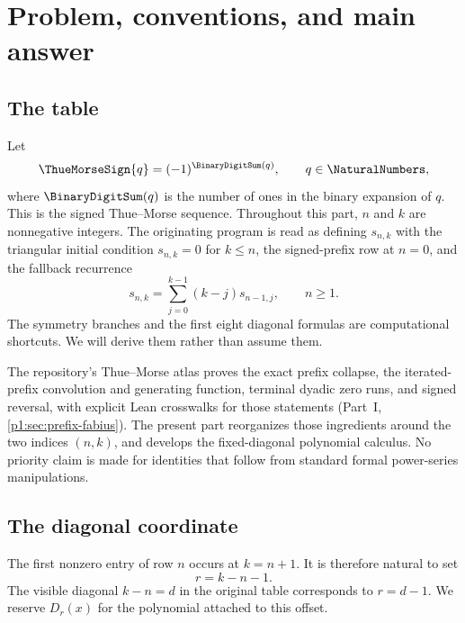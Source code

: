 \documentclass[11pt,oneside]{article}
\numberwithin{equation}{section}
\theoremstyle{definition}
\theoremstyle{remark}
\begin{document}
\section{Problem, conventions, and main answer}\label{p3:ch:problem}

\subsection{The table}

Let
\begin{equation}
  \ThueMorseSign{q}=(-1)^{\BinaryDigitSum(q)},\qquad q\in\NaturalNumbers,
  \label{p3:a:eq:tm-sign}
\end{equation}
where \(\BinaryDigitSum(q)\) is the number of ones in the binary expansion of \(q\).
This is the signed Thue--Morse sequence.  Throughout this part, \(n\) and
\(k\) are nonnegative integers.  The originating program is read as defining
\(s_{n,k}\) with the triangular initial condition \(s_{n,k}=0\) for
\(k\le n\), the signed-prefix row at \(n=0\), and the fallback recurrence
\begin{equation}
  s_{n,k}=\sum_{j=0}^{k-1}(k-j)s_{n-1,j},\qquad n\ge1.
  \label{p3:a:eq:weighted-recurrence}
\end{equation}
The symmetry branches and the first eight diagonal formulas are computational
shortcuts.  We will derive them rather than assume them.

The repository's Thue--Morse atlas proves the exact prefix collapse, the
iterated-prefix convolution and generating function, terminal dyadic zero
runs, and signed reversal, with explicit Lean crosswalks for those statements
(Part~I, \cref{p1:sec:prefix-fabius}).  The present part reorganizes those ingredients around
the two indices \((n,k)\), and develops the fixed-diagonal polynomial calculus.
No priority claim is made for identities that follow from standard formal
power-series manipulations.

\subsection{The diagonal coordinate}

The first nonzero entry of row \(n\) occurs at \(k=n+1\).  It is therefore
natural to set
\begin{equation}
  r=k-n-1.
  \label{p3:a:eq:r-coordinate}
\end{equation}
The visible diagonal \(k-n=d\) in the original table corresponds to
\(r=d-1\).  We reserve \(D_r(x)\) for the polynomial attached to this
offset.
\end{document}
